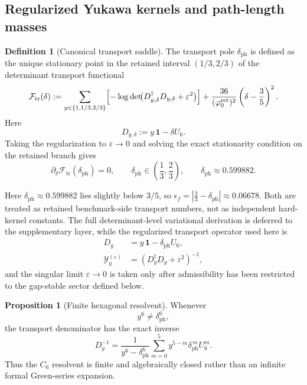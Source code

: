 \documentclass[11pt,a4paper]{article}
\theoremstyle{definition}
\newtheorem{definition}[theorem]{Definition}
\newtheorem{proposition}[theorem]{Proposition}
\theoremstyle{remark}
\newcommand{\phiz}{\varphi_0^{\mathrm{ret}}}
\begin{document}
\subsection{Regularized Yukawa kernels and path-length masses}

\begin{definition}[Canonical transport saddle]
The transport pole $\delta_{\mathrm{ph}}$ is defined as the unique stationary point in the retained interval $(1/3,2/3)$ of the determinant transport functional
\[
\mathcal F_{\mathrm{tr}}(\delta)
:=
\sum_{y\in\{1,1/3,2/3\}}
\Bigl[-\log\det\!\bigl(D_{y,\delta}^\dagger D_{y,\delta}+\varepsilon^2\bigr)\Bigr]
+
\frac{36}{(\phiz)^2}\left(\delta-\frac35\right)^2.
\]
Here
\[
D_{y,\delta}:=y\,\mathbf 1-\delta U_6.
\]
Taking the regularization to $\varepsilon\to0$ and solving the exact stationarity condition on the retained branch gives
\begin{equation}
\label{eq:transport-bridge-offset}
\partial_\delta \mathcal F_{\mathrm{tr}}(\delta_{\mathrm{ph}})=0,
\qquad
\delta_{\mathrm{ph}}\in\left(\frac13,\frac23\right),
\qquad
\delta_{\mathrm{ph}}\approx \num{0.599882}.
\end{equation}
\end{definition}

Here $\delta_{\mathrm{ph}}\approx \num{0.599882}$ lies slightly below $3/5$, so $\epsilon_f=|\frac23-\delta_{\mathrm{ph}}|\approx \num{0.06678}$. Both are treated as retained benchmark-side transport numbers, not as independent hard-kernel constants. The full determinant-level variational derivation is deferred to the supplementary layer, while the regularized transport operator used here is
\begin{equation}
\label{eq:yukawa-kernel}
\begin{aligned}
D_y&=y\,\mathbf 1-\delta_{\mathrm{ph}}U_6,\\
\mathcal Y_y^{(\varepsilon)}&=(D_y^\dagger D_y+\varepsilon^2)^{-1},
\end{aligned}
\end{equation}
and the singular limit $\varepsilon\to0$ is taken only after admissibility has been restricted to the gap-stable sector defined below.

\begin{proposition}[Finite hexagonal resolvent]
\label{prop:finite-hexagonal-resolvent}
Whenever
\[
y^6\neq \delta_{\mathrm{ph}}^6,
\]
the transport denominator has the exact inverse
\begin{equation}
\label{eq:finite-hexagonal-resolvent}
D_y^{-1}
=
\frac{1}{y^6-\delta_{\mathrm{ph}}^6}
\sum_{m=0}^{5}y^{5-m}\delta_{\mathrm{ph}}^{\,m}U_6^m.
\end{equation}
Thus the $C_6$ resolvent is finite and algebraically closed rather than an infinite formal Green-series expansion.
\end{proposition}
\end{document}

